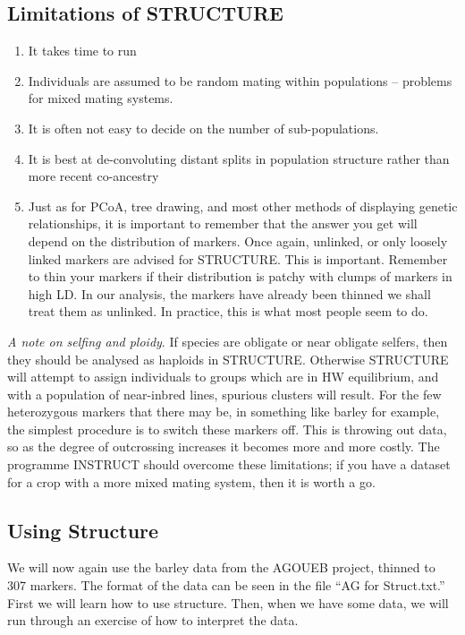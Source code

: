 \documentclass[
]{book}
\begin{document}
\hypertarget{limitations-of-structure}{%
\subsection{Limitations of STRUCTURE}\label{limitations-of-structure}}

\begin{enumerate}
\def\labelenumi{\arabic{enumi}.}
\item
  It takes time to run
\item
  Individuals are assumed to be random mating within populations -- problems for mixed mating systems.
\item
  It is often not easy to decide on the number of sub-populations.
\item
  It is best at de-convoluting distant splits in population structure rather than more recent co-ancestry
\item
  Just as for PCoA, tree drawing, and most other methods of displaying genetic relationships, it is important to remember that the answer you get will depend on the distribution of markers. Once again, unlinked, or only loosely linked markers are advised for STRUCTURE. This is important. Remember to thin your markers if their distribution is patchy with clumps of markers in high LD. In our analysis, the markers have already been thinned we shall treat them as unlinked. In practice, this is what most people seem to do.
\end{enumerate}

\emph{A note on selfing and ploidy}. If species are obligate or near obligate selfers, then they should be analysed as haploids in STRUCTURE. Otherwise STRUCTURE will attempt to assign individuals to groups which are in HW equilibrium, and with a population of near-inbred lines, spurious clusters will result. For the few heterozygous markers that there may be, in something like barley for example, the simplest procedure is to switch these markers off. This is throwing out data, so as the degree of outcrossing increases it becomes more and more costly. The programme INSTRUCT should overcome these limitations; if you have a dataset for a crop with a more mixed mating system, then it is worth a go.

\hypertarget{using-structure}{%
\subsection{Using Structure}\label{using-structure}}

We will now again use the barley data from the AGOUEB project, thinned to 307 markers. The format of the data can be seen in the file ``AG for Struct.txt.'' First we will learn how to use structure. Then, when we have some data, we will run through an exercise of how to interpret the data.
\end{document}
